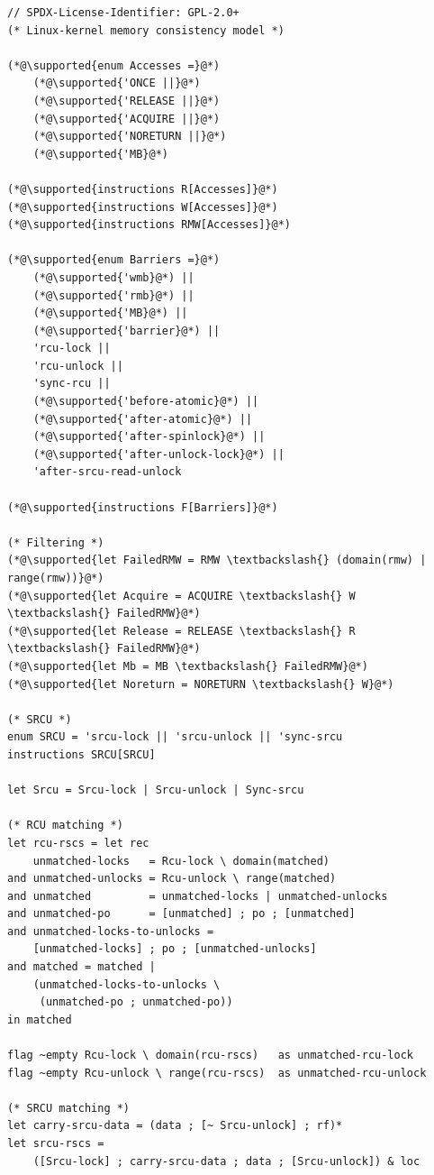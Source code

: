 \begin{lstlisting}
// SPDX-License-Identifier: GPL-2.0+
(* Linux-kernel memory consistency model *)

(*@\supported{enum Accesses =}@*)
    (*@\supported{'ONCE ||}@*)
    (*@\supported{'RELEASE ||}@*)
    (*@\supported{'ACQUIRE ||}@*)
    (*@\supported{'NORETURN ||}@*)
    (*@\supported{'MB}@*)

(*@\supported{instructions R[Accesses]}@*)
(*@\supported{instructions W[Accesses]}@*)
(*@\supported{instructions RMW[Accesses]}@*)

(*@\supported{enum Barriers =}@*)
    (*@\supported{'wmb}@*) ||
    (*@\supported{'rmb}@*) ||
    (*@\supported{'MB}@*) ||
    (*@\supported{'barrier}@*) ||
    'rcu-lock ||
    'rcu-unlock ||
    'sync-rcu ||
    (*@\supported{'before-atomic}@*) ||
    (*@\supported{'after-atomic}@*) ||
    (*@\supported{'after-spinlock}@*) ||
    (*@\supported{'after-unlock-lock}@*) ||
    'after-srcu-read-unlock

(*@\supported{instructions F[Barriers]}@*)

(* Filtering *)
(*@\supported{let FailedRMW = RMW \textbackslash{} (domain(rmw) | range(rmw))}@*)
(*@\supported{let Acquire = ACQUIRE \textbackslash{} W \textbackslash{} FailedRMW}@*)
(*@\supported{let Release = RELEASE \textbackslash{} R \textbackslash{} FailedRMW}@*)
(*@\supported{let Mb = MB \textbackslash{} FailedRMW}@*)
(*@\supported{let Noreturn = NORETURN \textbackslash{} W}@*)

(* SRCU *)
enum SRCU = 'srcu-lock || 'srcu-unlock || 'sync-srcu
instructions SRCU[SRCU]

let Srcu = Srcu-lock | Srcu-unlock | Sync-srcu

(* RCU matching *)
let rcu-rscs = let rec
    unmatched-locks   = Rcu-lock \ domain(matched)
and unmatched-unlocks = Rcu-unlock \ range(matched)
and unmatched         = unmatched-locks | unmatched-unlocks
and unmatched-po      = [unmatched] ; po ; [unmatched]
and unmatched-locks-to-unlocks =
    [unmatched-locks] ; po ; [unmatched-unlocks]
and matched = matched |
    (unmatched-locks-to-unlocks \
     (unmatched-po ; unmatched-po))
in matched

flag ~empty Rcu-lock \ domain(rcu-rscs)   as unmatched-rcu-lock
flag ~empty Rcu-unlock \ range(rcu-rscs)  as unmatched-rcu-unlock

(* SRCU matching *)
let carry-srcu-data = (data ; [~ Srcu-unlock] ; rf)*
let srcu-rscs =
    ([Srcu-lock] ; carry-srcu-data ; data ; [Srcu-unlock]) & loc


\end{lstlisting}
